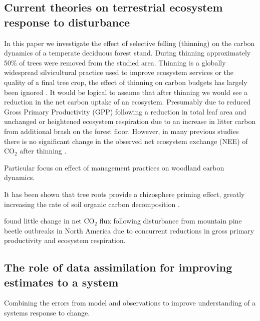 \documentclass[11pt]{article}
\begin{document}
\subsection{Current theories on terrestrial ecosystem response to disturbance}
In this paper we investigate the effect of selective felling (thinning) on the carbon dynamics of a temperate deciduous forest stand. During thinning approximately 50\% of trees were removed from the studied area. Thinning is a globally widespread silvicultural practice used to improve ecosystem services or the quality of a final tree crop, the effect of thinning on carbon budgets has largely been ignored \citep{JGRG:JGRG779}. It would be logical to assume that after thinning we would see a reduction in the net carbon uptake of an ecosystem. Presumably due to reduced Gross Primary Productivity (GPP) following a reduction in total leaf area and unchanged or heightened ecosystem respiration due to an increase in litter carbon from additional brash on the forest floor. However, in many previous studies there is no significant change in the observed net ecosystem exchange (NEE) of CO\(_{2}\) after thinning \citep{vesala2005effect, wilkinson2015effects, moreaux2011paired, dore2012recovery}.   

Particular focus on effect of management practices on woodland carbon dynamics.


It has been shown that tree roots provide a rhizosphere priming effect, greatly increasing the rate of soil organic carbon decomposition \citep{ELE:ELE1095}.

\citet{ELE:ELE12097} found little change in net CO\(_{2}\) flux following disturbance from mountain pine beetle outbreaks in North America due to concurrent reductions in gross primary productivity and ecosystem respiration.

\subsection{The role of data assimilation for improving estimates to a system}
Combining the errors from model and observations to improve understanding of a systems response to change.
\end{document}
